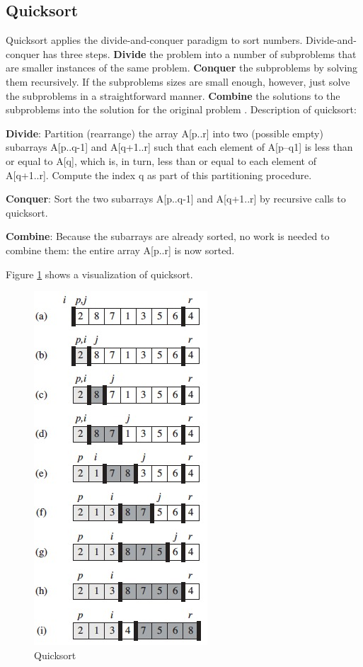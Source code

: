 \documentclass[a4paper, 11pt, titlepage]{article}
\begin{document}
\subsection{Quicksort}
Quicksort applies the divide-and-conquer paradigm to sort numbers. Divide-and-conquer has three steps. \textbf{Divide} the problem into a number of subproblems that are smaller instances of the same problem. \textbf{Conquer} the subproblems by solving them recursively. If the subproblems sizes are small enough, however, just solve the subproblems in a straightforward manner. \textbf{Combine} the solutions to the subproblems into the solution for the original problem \cite[chapter 4, page 65]{cormen}. Description of quicksort: \cite[chapter 7, page 170-171]{cormen}
\begin{list}{}{}
	\item \textbf{Divide}: Partition (rearrange) the array A[p..r] into two (possible empty) subarrays A[p..q-1] and A[q+1..r] such that each element of A[p--q1] is less than or equal to A[q], which is, in turn, less than or equal to each element of A[q+1..r]. Compute the index q as part of this partitioning procedure.
	\item \textbf{Conquer}: Sort the two subarrays A[p..q-1] and A[q+1..r] by recursive calls to quicksort.
	\item \textbf{Combine}: Because the subarrays are already sorted, no work is needed to combine them: the entire array A[p..r] is now sorted.
\end{list}
Figure \ref{qs} shows a visualization of quicksort.
\begin{figure}
	\begin{center}	
		\includegraphics[scale=0.5]{qs.jpg}
		\caption{Quicksort}
		\label{qs}
	\end{center}
\end{figure}
\end{document}
